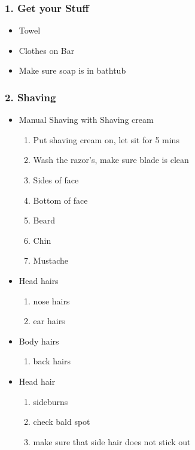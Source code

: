 \begin{frame}
\frametitle{1. Get your Stuff}
\begin{itemize}
\item Towel
\item Clothes on Bar
\item Make sure soap is in bathtub
\end{itemize}
\end{frame}


\begin{frame}
\frametitle{2. Shaving}

\begin{itemize}
\item Manual Shaving with Shaving cream
\begin{enumerate}
\item \tiny  Put shaving cream on, let sit for 5 mins
\item \tiny  Wash the razor's, make sure blade is clean
\item \tiny  Sides of face
\item \tiny  Bottom of face
\item \tiny  Beard
\item \tiny Chin
\item \tiny Mustache
\end{enumerate}
\item Head hairs
\begin{enumerate}
\item \tiny nose hairs
\item \tiny ear hairs
\end{enumerate}

\item Body hairs
\begin{enumerate}
\item \tiny back hairs
\end{enumerate}

\item Head hair
\begin{enumerate}
\item \tiny sideburns
\item \tiny check bald spot
\item \tiny make sure that side hair does not stick out
\end{enumerate}
\end{itemize}

\end{frame}


